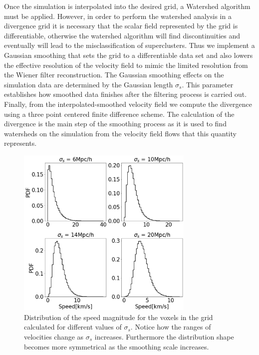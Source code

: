 \documentclass[usenatbib]{mnras}
\begin{document}
Once the simulation is interpolated into the desired grid, a Watershed algorithm must be applied. However, in order to perform the watershed analysis in a divergence grid it is necessary that the scalar field represented by the grid is
differentiable, otherwise the watershed algorithm will find
discontinuities and eventually will lead to the misclassification of
superclusters. Thus we implement a Gaussian smoothing that sets the grid to a differentiable data set and also lowers the effective resolution of the velocity field to mimic the limited resolution from the Wiener
filter reconstruction. The Gaussian smoothing effects on the simulation data are determined by the Gaussian length $\sigma_s$. This parameter establishes how smoothed data finishes after the filtering process is carried out. Finally, from the interpolated-smoothed velocity field we compute the
divergence using a three point centered finite difference scheme. The calculation of the divergence is the main step of the smoothing process as it is used to find watersheds on the simulation from the velocity field flows that this quantity represents.


\begin{figure}
    \centering
    \includegraphics[width=240pt]{smooth_vel_dist.pdf}
    \caption{Distribution of the speed magnitude for the voxels in the
      grid calculated for different values of $\sigma_{s}$. 
      Notice how the ranges of velocities change as $\sigma_{s}$
      increases.
    Furthermore the distribution shape becomes more symmetrical as the
    smoothing scale increases.}
    \label{fig:smooth_vel_dist}
\end{figure}
\end{document}
